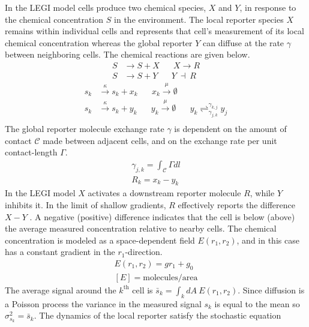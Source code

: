 \documentclass[phys,prelim]{puthesis}
\begin{document}
In the LEGI model cells produce two chemical species, $X$ and $Y$, in response to the chemical concentration $S$ in the environment. The local reporter species $X$ remains within individual cells and represents that cell’s measurement of its local chemical concentration whereas the global reporter $Y$ can diffuse at the rate $\gamma$ between neighboring cells. The chemical reactions are given below.
\begin{align*}
    S &\rightarrow S+X \hspace{20pt} X \rightarrow R \\
    S &\rightarrow S+Y \hspace{20pt} Y \ \dashv \ R
\end{align*}
\begin{equation}
    \begin{aligned}
        s_k &\xrightarrow{\kappa} s_k + x_k \hspace{20pt} x_k \xrightarrow{\mu} \emptyset \\
        s_k &\xrightarrow{\kappa} s_k + y_k \hspace{20pt} y_k \xrightarrow{\mu} \emptyset \hspace{20pt} y_k \rightleftharpoons_{\gamma_{j,k}}^{\gamma_{k,j}} y_{j} \\
    \end{aligned}
\end{equation}
The global reporter molecule exchange rate $\gamma$ is dependent on the amount of contact $\mathcal{C}$ made between adjacent cells, and on the exchange rate per unit contact-length $\Gamma$.
\begin{gather}
    \gamma_{j,k} = \int_{\mathcal{C}} \Gamma dl \\
    R_k = x_k - y_k
\end{gather}
In the LEGI model $X$ activates a downstream reporter molecule $R$, while $Y$ inhibits it. In the limit of shallow gradients, $R$ effectively reports the difference $X-Y$ \cite{ellison2015cell}. A negative (positive) difference indicates that the cell is below (above) the average measured concentration relative to nearby cells. The chemical concentration is modeled as a space-dependent field $E(r_1,r_2)$, and in this case has a constant gradient in the $r_1$-direction.
\begin{gather*}
    E(r_1,r_2) = gr_1 + g_0 \\[0pt]
    [ E ] = \text{molecules} / \text{area}
\end{gather*}
The average signal around the $k^\text{th}$ cell is $\bar{s}_k = \int_k dA \ E(r_1,r_2)$. Since diffusion is a Poisson process the variance in the measured signal $s_k$ is equal to the mean so $\sigma_{s_k}^2 = \bar{s}_k$. The dynamics of the local reporter satisfy the stochastic equation
\end{document}
